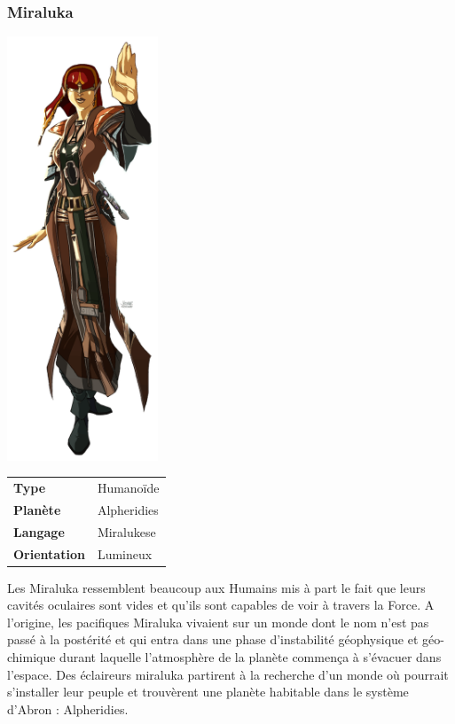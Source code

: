 \subsubsection{Miraluka}
\begin{samepage}
	\vspace{-2\baselineskip}
	\includegraphics[width=4.5cm]{img/personnages/races/miraluka.png}

	\vspace{-5\baselineskip}

	\begin{flushright}
		\begin{tabular}{ l l }
			\textbf{Type} 			& Humanoïde \\
		   	\textbf{Planète} 		& Alpheridies \\
		   	\textbf{Langage} 		& Miralukese \\
		   	\textbf{Orientation} 	& Lumineux \\
		\end{tabular}
	\end{flushright}
\end{samepage}

Les Miraluka ressemblent beaucoup aux Humains mis à part le fait que leurs cavités oculaires sont vides et qu’ils sont capables de voir à travers la Force. A l’origine, les pacifiques Miraluka vivaient sur un monde dont le nom n’est pas passé à la postérité et qui entra dans une phase d’instabilité géophysique et géo-chimique durant laquelle l’atmosphère de la planète commença à s’évacuer dans l’espace. Des éclaireurs miraluka partirent à la recherche d’un monde où pourrait s’installer leur peuple et trouvèrent une planète habitable dans le système d’Abron : Alpheridies. 


